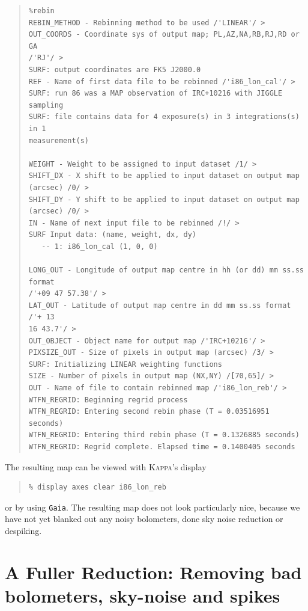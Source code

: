\documentclass[twoside,11pt]{article}
\newenvironment{myquote}{\begin{quote}\begin{small}}{\end{small}\end{quote}}
\newcommand{\Kappa}{\xref{\textsc{Kappa}}{sun95}{}}
\newcommand{\task}[1]{\textsf{#1}}
\newcommand{\display}{\xref{\task{display}}{sun95}{DISPLAY}}
\newcommand{\xref}[3]{#1}
\newcommand{\xlabel}[1]{}
\renewcommand{\_}{\texttt{\symbol{95}}}
\begin{document}
\begin{myquote}
\begin{verbatim}
%rebin
REBIN_METHOD - Rebinning method to be used /'LINEAR'/ > 
OUT_COORDS - Coordinate sys of output map; PL,AZ,NA,RB,RJ,RD or GA 
/'RJ'/ > 
SURF: output coordinates are FK5 J2000.0
REF - Name of first data file to be rebinned /'i86_lon_cal'/ > 
SURF: run 86 was a MAP observation of IRC+10216 with JIGGLE sampling
SURF: file contains data for 4 exposure(s) in 3 integrations(s) in 1
measurement(s)

WEIGHT - Weight to be assigned to input dataset /1/ > 
SHIFT_DX - X shift to be applied to input dataset on output map 
(arcsec) /0/ > 
SHIFT_DY - Y shift to be applied to input dataset on output map 
(arcsec) /0/ > 
IN - Name of next input file to be rebinned /!/ > 
SURF Input data: (name, weight, dx, dy)
   -- 1: i86_lon_cal (1, 0, 0)

LONG_OUT - Longitude of output map centre in hh (or dd) mm ss.ss 
format
/'+09 47 57.38'/ > 
LAT_OUT - Latitude of output map centre in dd mm ss.ss format /'+ 13 
16 43.7'/ > 
OUT_OBJECT - Object name for output map /'IRC+10216'/ > 
PIXSIZE_OUT - Size of pixels in output map (arcsec) /3/ > 
SURF: Initializing LINEAR weighting functions
SIZE - Number of pixels in output map (NX,NY) /[70,65]/ > 
OUT - Name of file to contain rebinned map /'i86_lon_reb'/ > 
WTFN_REGRID: Beginning regrid process
WTFN_REGRID: Entering second rebin phase (T = 0.03516951 seconds)
WTFN_REGRID: Entering third rebin phase (T = 0.1326885 seconds)
WTFN_REGRID: Regrid complete. Elapsed time = 0.1400405 seconds
\end{verbatim}
\end{myquote}

The resulting map can be viewed with \Kappa's \display

\begin{myquote}
\begin{verbatim}
% display axes clear i86_lon_reb
\end{verbatim}
\end{myquote}

or by using \texttt{Gaia}.  The resulting map does not look
particularly nice, because we have not yet blanked out any noisy
bolometers, done sky noise reduction or despiking.



\section{\xlabel{Fuller_reduct}A Fuller Reduction: Removing bad
bolometers, sky-noise and spikes}
\end{document}
